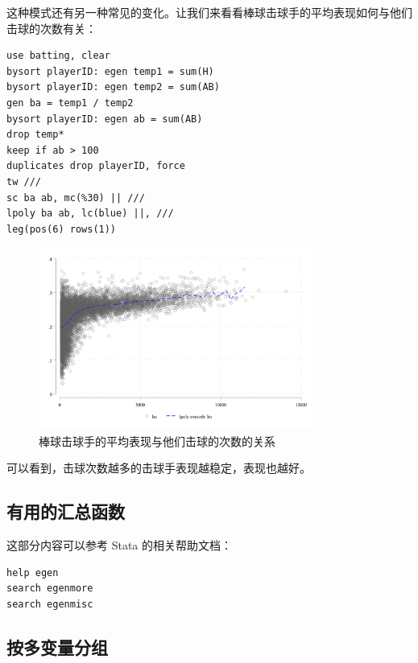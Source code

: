 \documentclass[]{ctexbook}
\begin{document}
这种模式还有另一种常见的变化。让我们来看看棒球击球手的平均表现如何与他们击球的次数有关：

\begin{lstlisting}
use batting, clear
bysort playerID: egen temp1 = sum(H)
bysort playerID: egen temp2 = sum(AB)
gen ba = temp1 / temp2
bysort playerID: egen ab = sum(AB)
drop temp*
keep if ab > 100
duplicates drop playerID, force
tw ///
sc ba ab, mc(%30) || ///
lpoly ba ab, lc(blue) ||, ///
leg(pos(6) rows(1))
\end{lstlisting}

\begin{figure}

{\centering \includegraphics[width=0.8\textwidth]{assets/scbaab} 

}

\caption{棒球击球手的平均表现与他们击球的次数的关系}\label{fig:scbaab}
\end{figure}

可以看到，击球次数越多的击球手表现越稳定，表现也越好。

\hypertarget{section-54}{%
\subsection{有用的汇总函数}\label{section-54}}

这部分内容可以参考 Stata 的相关帮助文档：

\begin{lstlisting}
help egen 
search egenmore
search egenmisc
\end{lstlisting}

\hypertarget{section-55}{%
\subsection{按多变量分组}\label{section-55}}
\end{document}
